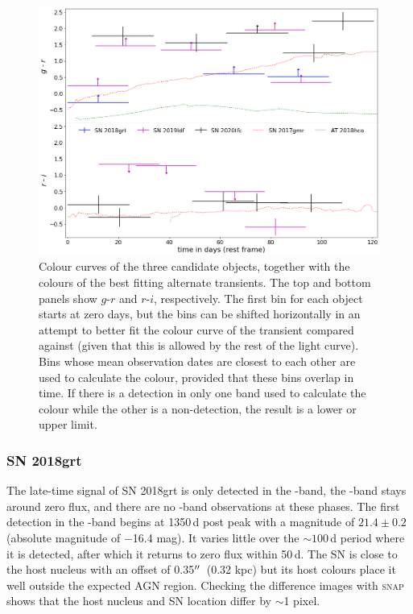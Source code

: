 \documentclass[a4paper,oneside,12pt, class=Latex/Classes/PhDthesisPSnPDF, crop=false]{standalone}
\begin{document}
\begin{figure}
 \centering
 \includegraphics[width=13cm]{../Images/chapter_3/candid_colours.png}
 \caption{Colour curves of the three candidate objects, together with the colours of the best fitting alternate transients. The top and bottom panels show $g$-$r$ and $r$-$i$, respectively. The first bin for each object starts at zero days, but the bins can be shifted horizontally in an attempt to better fit the colour curve of the transient compared against (given that this is allowed by the rest of the light curve). Bins whose mean observation dates are closest to each other are used to calculate the colour, provided that these bins overlap in time. If there is a detection in only one band used to calculate the colour while the other is a non-detection, the result is a lower or upper limit.}
 \label{candidate_colours}
\end{figure}

\subsubsection*{SN 2018grt}
The late-time signal of SN 2018grt is only detected in the \ztfr-band, the \ztfg-band stays around zero flux, and there are no \ztfi-band observations at these phases. The first detection in the \ztfr-band begins at 1350\,d post peak with a magnitude of $21.4\pm0.2$ (absolute magnitude of $-$16.4 mag). It varies little over the $\sim 100$\,d period where it is detected, after which it returns to zero flux within 50\,d. The SN is close to the host nucleus with an offset of 0.35$^{\prime\prime}$~(0.32 kpc) but its host colours place it well outside the expected AGN region. Checking the difference images with \textsc{snap} shows that the host nucleus and SN location differ by $\sim$1 pixel. 
\end{document}
